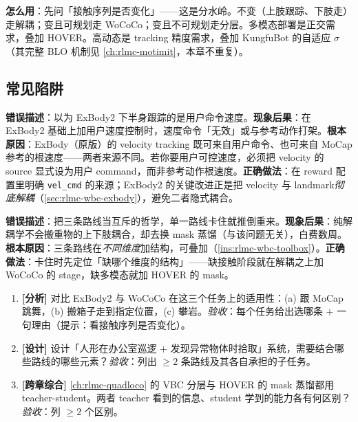 \textbf{怎么用}：先问「接触序列是否变化」——这是分水岭。不变（上肢跟踪、下肢走）走解耦；变且可规划走 WoCoCo；变且不可规划走分层。多模态部署是正交需求，叠加 HOVER。高动态是 tracking 精度需求，叠加 KungfuBot 的自适应 $\sigma$（其完整 BLO 机制见 \cref{ch:rlmc-motimit}，本章不重复）。

\subsection{常见陷阱}
\begin{pitfall}
\textbf{错误描述}：以为 ExBody2 下半身跟踪的是用户命令速度。\textbf{现象后果}：在 ExBody2 基础上加用户速度控制时，速度命令「无效」或与参考动作打架。\textbf{根本原因}：ExBody（原版）的 velocity tracking 既可来自用户命令、也可来自 MoCap 参考的根速度——两者来源不同。若你要用户可控速度，必须把 velocity 的 source 显式设为用户 command，而非参考动作根速度。\textbf{正确做法}：在 reward 配置里明确 \verb|vel_cmd| 的来源；ExBody2 的关键改进正是把 velocity 与 landmark\emph{彻底解耦}（\cref{sec:rlmc-wbc-exbody}），避免二者隐式耦合。
\end{pitfall}
\begin{pitfall}[以为「选了一条路线就不能用另一条」]
\textbf{错误描述}：把三条路线当互斥的哲学，单一路线卡住就推倒重来。\textbf{现象后果}：纯解耦学不会搬重物的上下肢耦合，却去换 mask 蒸馏（与该问题无关），白费数周。\textbf{根本原因}：三条路线在\emph{不同维度}加结构，可叠加（\cref{ins:rlmc-wbc-toolbox}）。\textbf{正确做法}：卡住时先定位「缺哪个维度的结构」——缺接触阶段就在解耦之上加 WoCoCo 的 stage，缺多模态就加 HOVER 的 mask。
\end{pitfall}

\begin{practice}[本节动手]
\begin{enumerate}
  \item \textbf{[分析]} 对比 ExBody2 与 WoCoCo 在这三个任务上的适用性：(a) 跟 MoCap 跳舞，(b) 搬箱子走到指定位置，(c) 攀岩。\emph{验收}：每个任务给出选哪条 $+$ 一句理由（提示：看接触序列是否变化）。
  \item \textbf{[设计]} 设计「人形在办公室巡逻 $+$ 发现异常物体时拾取」系统，需要结合哪些路线的哪些元素？\emph{验收}：列出 $\geq 2$ 条路线及其各自承担的子任务。
  \item \textbf{[跨章综合]} \cref{ch:rlmc-quadloco} 的 VBC 分层与 HOVER 的 mask 蒸馏都用 teacher-student。两者 teacher 看到的信息、student 学到的能力各有何区别？\emph{验收}：列 $\geq 2$ 个区别。
\end{enumerate}
\end{practice}

